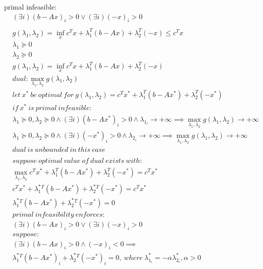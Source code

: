 \documentclass[12pt,letter]{article}
\begin{document}
\begin{enumerate}
\begin{itemize}
  primal infeasible:
    \begin{align*}
      &(\exists i) (b-Ax)_i > 0 \vee (\exists i) (-x)_i > 0\\
      \\
      &g(\lambda_1,\lambda_2) = \inf_x c^Tx +\lambda_1^T(b-Ax) + \lambda_2^T(-x) \leq c^Tx\\
      &\lambda_1 \succeq 0\\
      &\lambda_2 \succeq 0\\
      &g(\lambda_1,\lambda_2) = \inf_x c^Tx +\lambda_1^T(b-Ax) + \lambda_2^T(-x)\\
      &dual: \max_{\lambda_1,\lambda_2} g(\lambda_1,\lambda_2)\\
      &let\ x^*\ be\ optimal\ for\ g(\lambda_1,\lambda_2) = c^Tx^* +\lambda_1^T(b-Ax^*) + \lambda_2^T(-x^*)\\
      &if\ x^*\ is\ primal\ infeasible:\\
      &\lambda_1 \succeq 0, \lambda_2 \succeq 0 \wedge (\exists i) (b-Ax^*)_i > 0 \wedge \lambda_{1_i} \to +\infty \implies \max_{\lambda_1, \lambda_2} g(\lambda_1,\lambda_2) \to +\infty\\
      &\lambda_1 \succeq 0, \lambda_2 \succeq 0 \wedge (\exists i) (-x^*)_i > 0 \wedge \lambda_{2_i} \to +\infty \implies \max_{\lambda_1, \lambda_2} g(\lambda_1,\lambda_2) \to +\infty\\
      &dual\ is\ unbounded\ in\ this\ case\\
      \\
      &suppose\ optimal\ value\ of\ dual\ exists\ with:\\
      &\max_{\lambda_1,\lambda_2} c^Tx^* +\lambda_1^T(b-Ax^*) + \lambda_2^T(-x^*) = c^Tx^*\\
      &c^Tx^* +\lambda_1^*^T(b-Ax^*) + \lambda_2^*^T(-x^*) = c^Tx^*\\
      &\lambda_1^*^T(b-Ax^*) + \lambda_2^*^T(-x^*) = 0\\
      &primal\ infeasibility\ enforces:\\
      &(\exists i)(b-Ax)_i > 0 \vee (\exists i)(-x)_i > 0\\
      &suppose:\\
      &(\exists i)(b-Ax)_i > 0 \wedge (-x)_i < 0 \implies\\
      &\lambda_1^*^T(b-Ax^*)_i + \lambda_2^*^T(-x^*)_i = 0,\ where\ \lambda_{1_i}^* = -\alpha \lambda_{2_i}^*, \alpha > 0\\

\end{align*}
\end{itemize}
\end{enumerate}
\end{document}
